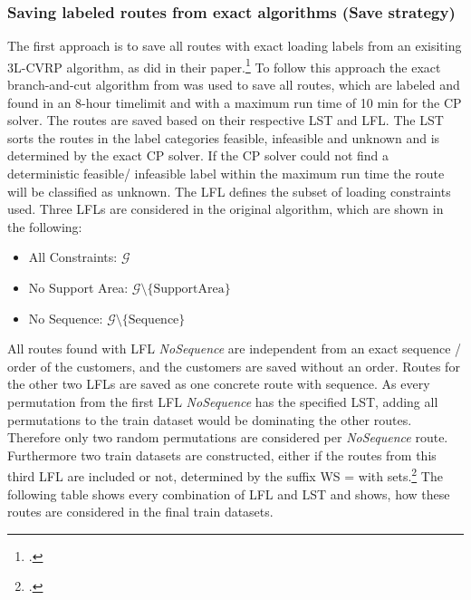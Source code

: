 \subsubsection{Saving labeled routes from exact algorithms (Save strategy)}
The first approach is to save all routes with exact loading labels from an exisiting \gls{3L-CVRP}
algorithm, as \cite{zhang_learning-based_2022} did in their paper.\footcite[cf.][]{zhang_learning-based_2022}
To follow this approach the exact branch-and-cut algorithm from \cite{tamke_branch-and-cut_2024} was
used to save all routes, which are labeled and found in an 8-hour timelimit and with a maximum run time of 10 min for the \gls{CP} solver.
The routes are saved based on their respective \gls{LST} and \gls{LFL}. The \gls{LST} sorts the routes in the
label categories feasible, infeasible and unknown and is determined by the exact \gls{CP} solver.
If the \gls{CP} solver could not find a deterministic feasible/ infeasible label within the maximum run time the route
will be classified as unknown. The \gls{LFL} defines the subset of
loading constraints used. Three \glspl{LFL} are considered in the original algorithm, which are shown
in the following:
\begin{itemize}
    \item All Constraints: $\mathcal{G}$
    \item No Support Area: $\mathcal{G}\setminus \{\text{SupportArea}\}$
    \item No Sequence: $\mathcal{G}\setminus \{\text{Sequence}\}$
\end{itemize}
All routes found with \gls{LFL} \textit{NoSequence} are independent from an exact sequence / order of the customers,
and the customers are saved without an order. Routes for the other two \glspl{LFL} are saved as one concrete route with sequence.
As every permutation from the first \gls{LFL} \textit{NoSequence} has the specified \gls{LST}, adding all permutations to
the train dataset would be dominating the other routes. Therefore only two random permutations are considered per \textit{NoSequence}
route. Furthermore two train datasets are constructed, either if the routes from this third \gls{LFL} are included or not, determined
by the suffix WS = with sets.\footcites[Retrieved from][]{tamke_repository_2024}[cf.][]{tamke_branch-and-cut_2024}
The following table shows every combination of \gls{LFL} and \gls{LST} and shows, how these routes are considered in the final train
datasets.

